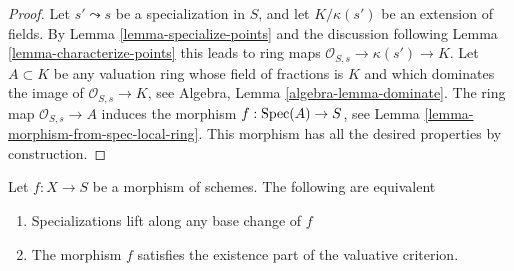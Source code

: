 \begin{proof}
Let $s' \leadsto s$ be a specialization in $S$, and let
$K/\kappa(s')$ be an extension of fields. By
Lemma \ref{lemma-specialize-points}
and the discussion following
Lemma \ref{lemma-characterize-points}
this leads to ring maps $\mathcal{O}_{S, s} \to \kappa(s') \to K$.
Let $A \subset K$ be any valuation ring whose field of fractions is
$K$ and which dominates the image of $\mathcal{O}_{S, s} \to K$, see
Algebra, Lemma \ref{algebra-lemma-dominate}.
The ring map $\mathcal{O}_{S, s} \to A$ induces the morphism
$f : \mathop{\mathrm{Spec}}(A) \to S$, see
Lemma \ref{lemma-morphism-from-spec-local-ring}.
This morphism has all the desired properties by construction.
\end{proof}

\begin{lemma}
\label{lemma-lift-specializations-valuative}
Let $f : X \to S$ be a morphism of schemes.
The following are equivalent
\begin{enumerate}
\item Specializations lift along any base change of $f$
\item The morphism $f$ satisfies the existence part of the
valuative criterion.
\end{enumerate}
\end{lemma}

